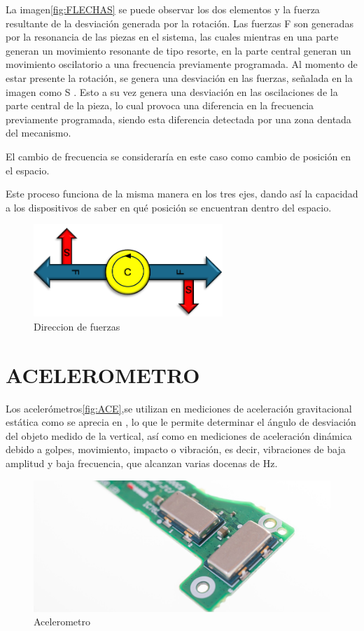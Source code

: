 \newpage
 La imagen\autoref{fig:FLECHAS} se puede observar los dos elementos y la fuerza resultante de la desviación generada por la rotación. Las fuerzas F son generadas por la resonancia de las piezas en el sistema, las cuales mientras en una parte generan un movimiento resonante de tipo resorte, en la parte central generan un movimiento oscilatorio a una frecuencia previamente programada. Al momento de estar presente la rotación, se genera una desviación en las fuerzas, señalada en la imagen como S \cite{SICK_Encodersd}. Esto a su vez genera una desviación en las oscilaciones de la parte central de la pieza, lo cual provoca una diferencia en la frecuencia previamente programada, siendo esta diferencia detectada por una zona dentada del mecanismo.

El cambio de frecuencia se consideraría en este caso como cambio de posición en el espacio. 

Este proceso funciona de la misma manera en los tres ejes, dando así la capacidad a los dispositivos de saber en qué posición se encuentran dentro del espacio.
\begin{figure}[h]
	\centering
	\includegraphics[width=0.3\linewidth]{img/FLECHAS}
	\caption{Direccion de fuerzas  }
	\label{fig:FLECHAS}
\end{figure}

\section{ACELEROMETRO}

Los acelerómetros\autoref{fig:ACE},se utilizan en mediciones de aceleración gravitacional estática como se aprecia en \cite{TME_Acelerometro}, lo que le permite determinar el ángulo de desviación del objeto medido de la vertical, así como en mediciones de aceleración dinámica debido a golpes, movimiento, impacto o vibración, es decir, vibraciones de baja amplitud y baja frecuencia, que alcanzan varias docenas de Hz.
\begin{figure}[h]
	\centering
	\includegraphics[width=0.3\linewidth]{img/ACE}
	\caption{Acelerometro }
	\label{fig:ACE}
\end{figure}


